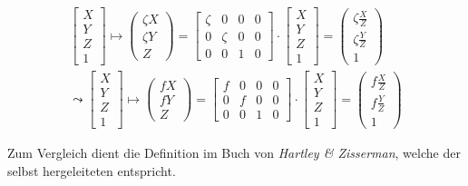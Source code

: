 \begin{gather}
\begin{bmatrix}
X\\Y\\Z\\1
\end{bmatrix} \mapsto
\begin{pmatrix}
\zeta X\\ \zeta Y\\ Z
\end{pmatrix}
=
\begin{bmatrix}
\zeta&0&0&0\\
0&\zeta&0&0\\
0&0&1&0
\end{bmatrix}
\cdot
\begin{bmatrix}
X\\Y\\Z\\1
\end{bmatrix}
=
\begin{pmatrix}
\zeta \frac{X}{Z}\\ \zeta \frac{Y}{Z}\\1
\end{pmatrix}\\
\leadsto
\begin{bmatrix}
X\\Y\\Z\\1
\end{bmatrix} \mapsto
\begin{pmatrix}
f X\\ f Y\\ Z
\end{pmatrix}
=
\begin{bmatrix}
f&0&0&0\\
0&f&0&0\\
0&0&1&0
\end{bmatrix}
\cdot
\begin{bmatrix}
X\\Y\\Z\\1
\end{bmatrix}
=
\begin{pmatrix}
f \frac{X}{Z}\\ f \frac{Y}{Z}\\1
\end{pmatrix}
\end{gather}

Zum Vergleich dient die Definition im Buch von \textit{Hartley \& Zisserman}\cite{HZ}, welche der selbst hergeleiteten entspricht.


